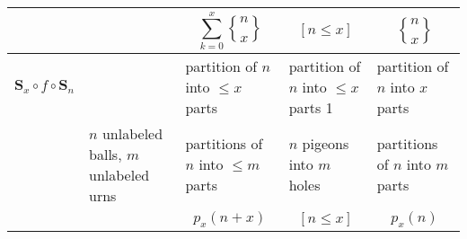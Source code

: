 \documentclass[]{article}
\newcommand{\stirlingii}{\genfrac{\{}{\}}{0pt}{}}
\begin{document}
\begin{tabular}{ | p{.6in} | p{0.9in} || p{1.7in} | p{1.7in} | p{1.7in} |  }
&
& $$\sum_{k=0}^{x} \stirlingii{n}{x}$$
& $$[n \leq x]$$
& $$\stirlingii{n}{x}$$
\\

\hline


\rowcolor{Gray} 
$\mathbf{S}_x \circ f \circ \mathbf{S}_n$
&
& partition of $n$ into $\leq x$ parts
& partition of $n$ into $\leq x$ parts 1
& partition of $n$ into $x$ parts
\\

& $n$ unlabeled balls, $m$ unlabeled urns
& partitions of $n$ into $\leq m$ parts
& $n$ pigeons into $m$ holes
& partitions of $n$ into $m$ parts
\\

& 
& $$p_x(n+x)$$
& $$[n \leq x]$$
& $$p_x(n)$$
\\

\hline
\end{tabular}

\printbibliography
\end{document}
